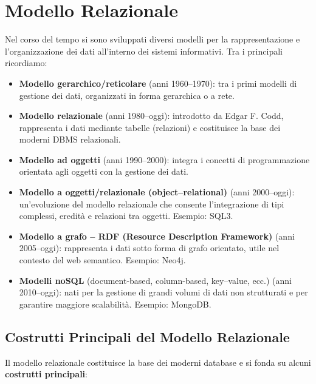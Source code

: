 \section{Modello Relazionale}

Nel corso del tempo si sono sviluppati diversi modelli per la rappresentazione e l’organizzazione dei dati all’interno dei sistemi informativi. Tra i principali ricordiamo:

\begin{itemize}
    \item \textbf{Modello gerarchico/reticolare} (anni 1960–1970): tra i primi modelli di gestione dei dati, organizzati in forma gerarchica o a rete.
    \item \textbf{Modello relazionale} (anni 1980–oggi): introdotto da Edgar F. Codd, rappresenta i dati mediante tabelle (relazioni) e costituisce la base dei moderni DBMS relazionali.
    \item \textbf{Modello ad oggetti} (anni 1990–2000): integra i concetti di programmazione orientata agli oggetti con la gestione dei dati.
    \item \textbf{Modello a oggetti/relazionale (object–relational)} (anni 2000–oggi): un’evoluzione del modello relazionale che consente l’integrazione di tipi complessi, eredità e relazioni tra oggetti. Esempio: SQL3.
    \item \textbf{Modello a grafo – RDF (Resource Description Framework)} (anni 2005–oggi): rappresenta i dati sotto forma di grafo orientato, utile nel contesto del web semantico. Esempio: Neo4j.
    \item \textbf{Modelli noSQL} (document-based, column-based, key–value, ecc.) (anni 2010–oggi): nati per la gestione di grandi volumi di dati non strutturati e per garantire maggiore scalabilità. Esempio: MongoDB.
\end{itemize}
\subsection{Costrutti Principali del Modello Relazionale}
Il modello relazionale costituisce la base dei moderni database e si fonda su alcuni \textbf{costrutti principali}:

